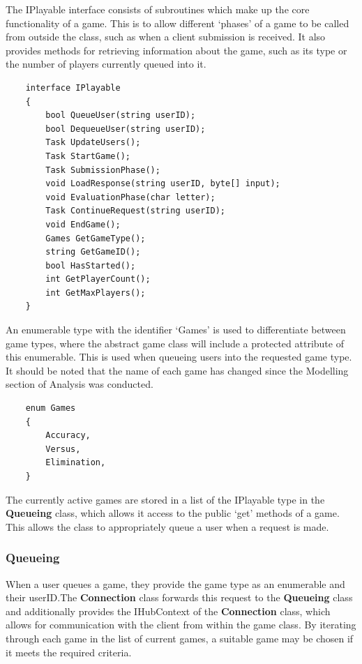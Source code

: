 \documentclass{article}
\begin{document}
The IPlayable interface consists of subroutines which make up the core functionality of a game. This is to allow different `phases' of a game to be called from outside the class, such as when a client submission is received. It also provides methods for retrieving information about the game, such as its type or the number of players currently queued into it.

\begin{verbatim}
    interface IPlayable
    {
        bool QueueUser(string userID);
        bool DequeueUser(string userID);
        Task UpdateUsers();
        Task StartGame();
        Task SubmissionPhase();
        void LoadResponse(string userID, byte[] input);
        void EvaluationPhase(char letter);
        Task ContinueRequest(string userID);
        void EndGame();
        Games GetGameType();
        string GetGameID();
        bool HasStarted();
        int GetPlayerCount();
        int GetMaxPlayers();
    }
\end{verbatim}

An enumerable type with the identifier `Games' is used to differentiate between game types, where the abstract game class will include a protected attribute of this enumerable. This is used when queueing users into the requested game type. It should be noted that the name of each game has changed since the Modelling section of Analysis was conducted.

\begin{verbatim}
    enum Games
    {
        Accuracy,
        Versus,
        Elimination,
    }
\end{verbatim}

The currently active games are stored in a list of the IPlayable type in the \textbf{Queueing} class, which allows it access to the public `get' methods of a game. This allows the class to appropriately queue a user when a request is made.

\subsubsection{Queueing}

When a user queues a game, they provide the game type as an enumerable and their userID.\@ The \textbf{Connection} class forwards this request to the \textbf{Queueing} class and additionally provides the IHubContext of the \textbf{Connection} class, which allows for communication with the client from within the game class. By iterating through each game in the list of current games, a suitable game may be chosen if it meets the required criteria.
\end{document}

